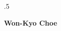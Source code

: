 \documentclass[margin, 10pt]{res} %
\begin{document}

\moveleft.5\hoffset\centerline{\large\bf Won-Kyo Choe} %

%

\end{document}
